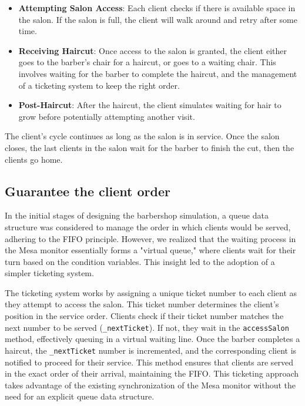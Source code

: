 \documentclass{article}
\begin{document}
    \begin{itemize}
        \item \textbf{Attempting Salon Access}: Each client checks if there is available space in the salon. If the salon is full, the client will walk around and retry after some time.
        \item \textbf{Receiving Haircut}: Once access to the salon is granted, the client either goes to the barber's chair for a haircut, or goes to a waiting chair. This involves waiting for the barber to complete the haircut, and the management of a ticketing system to keep the right order.
        \item \textbf{Post-Haircut}: After the haircut, the client simulates waiting for hair to grow before potentially attempting another visit.
    \end{itemize}

    The client's cycle continues as long as the salon is in service. Once the salon closes, the last clients in the salon wait for the barber to finish the cut, then the clients go home.

    \subsection{Guarantee the client order}

    In the initial stages of designing the barbershop simulation, a queue data structure was considered to manage the order in which clients would be served, adhering to the FIFO principle. However, we realized that the waiting process in the Mesa monitor essentially forms a "virtual queue," where clients wait for their turn based on the condition variables. This insight led to the adoption of a simpler ticketing system.

    The ticketing system works by assigning a unique ticket number to each client as they attempt to access the salon. This ticket number determines the client's position in the service order. Clients check if their ticket number matches the next number to be served (\texttt{\_nextTicket}). If not, they wait in the \texttt{accessSalon} method, effectively queuing in a virtual waiting line. Once the barber completes a haircut, the \texttt{\_nextTicket} number is incremented, and the corresponding client is notified to proceed for their service. This method ensures that clients are served in the exact order of their arrival, maintaining the FIFO. This ticketing approach takes advantage of the existing synchronization of the Mesa monitor without the need for an explicit queue data structure.
\end{document}
